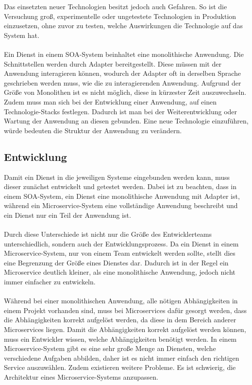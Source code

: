 Das einsetzten neuer Technologien besitzt jedoch auch Gefahren. So ist die Versuchung groß, experimentelle oder ungetestete Technologien in Produktion einzusetzen, ohne zuvor zu testen, welche Auswirkungen die Technologie auf das System hat.
\\\\
Ein Dienst in einem SOA-System beinhaltet eine monolithische Anwendung. Die Schnittstellen werden durch Adapter bereitgestellt. Diese müssen mit der Anwendung interagieren können, wodurch der Adapter oft in derselben Sprache geschrieben werden muss, wie die zu interagierenden Anwendung. Aufgrund der Größe von Monolithen ist es nicht möglich, diese in kürzester Zeit auszuwechseln. Zudem muss man sich bei der Entwicklung einer Anwendung, auf einen Technologie-Stacks festlegen. Dadurch ist man bei der Weiterentwicklung oder Wartung der Anwendung an diesen gebunden. Eine neue Technologie einzuführen, würde bedeuten die Struktur der Anwendung zu verändern.

\subsection{Entwicklung}
\label{subsec:Entwicklung}
Damit ein Dienst in die jeweiligen Systeme eingebunden werden kann, muss dieser zunächst entwickelt und getestet werden. Dabei ist zu beachten, dass in einem SOA-System, ein Dienst eine monolithische Anwendung mit Adapter ist, während ein Microservice-System eine vollständige Anwendung beschreibt und ein Dienst nur ein Teil der Anwendung ist.
\\\\
Durch diese Unterschiede ist nicht nur die Größe des Entwicklerteams unterschiedlich, sondern auch der Entwicklungsprozess. Da ein Dienst in einem Microservice-System, nur von einem Team entwickelt werden sollte, stellt dies eine Begrenzung der Größe eines Dienstes dar. Dadurch ist in der Regel ein Microservice deutlich kleiner, als eine monolithische Anwendung, jedoch nicht immer einfacher zu entwickeln.
\\\\
Während bei einer monolithischen Anwendung, alle nötigen Abhängigkeiten in einem Projekt vorhanden sind, muss bei Microservices dafür gesorgt werden, dass die Abhängigkeiten korrekt aufgelöst werden, da diese in dem Bereich anderer Microservices  liegen. Damit die Abhängigkeiten korrekt aufgelöst werden können, muss ein Entwickler wissen, welche Abhängigkeiten benötigt werden. In einem Microservice-System gibt es eine sehr große Menge an Diensten, welche verschiedene Aufgaben abbilden, daher ist es nicht immer einfach den richtigen Service auszuwählen. Zudem existieren weitere Probleme. Es ist schwierig, die Architektur eines Microservice-Systems anzupassen.

